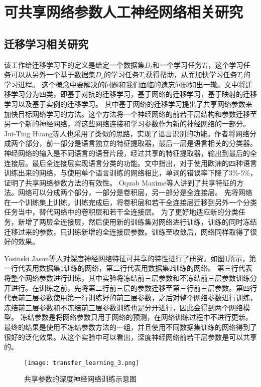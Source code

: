 \section{可共享网络参数人工神经网络相关研究}

\subsection{迁移学习相关研究}
该工作\cite{10.1007/978-3-030-01424-7_27}给迁移学习下的定义是给定一个数据集$D_t$和一个学习任务$T_t$，这个学习任务可以从另外一个基于数据集$D_s$的学习任务$T_s$获得帮助，从而加快学习任务$T_t$的学习进程。
这个概念中要解决的问题和我们面临的遗忘问题如出一辙。文中将迁移学习分为四类，即基于对抗的迁移学习，基于网络的迁移学习，基于映射的迁移学习以及基于实例的迁移学习。
其中基于网络的迁移学习提出了共享网络参数来加快目标网络学习的方法。这个方法将一个神经网络的前若干层结构和参数迁移至另一个新的神经网络，将这些网络连接和学习参数作为新的神经网络的一部分。
Jui-Ting Huang等人\cite{6639081}也采用了类似的思路，实现了语言识别的功能。作者将网络分成两个部分，前一部分是语言独立的特征提取器，最后一层是语言相关的分类器。
神经网络的输入是不同语言的语音片段，经过共享的特征提取器，输出到最后的全连接层。最后全连接层实现语言分类的功能。文中指出，对于使用欧洲的四种语言训练出来的网络，与使用单个语言训练的网络相比，单词的错误率下降了3\%-5\%，证明了共享网络参数方法的有效性。
Oquab Maxime等人\cite{Oquab_2014_CVPR}讲到了共享特征的方法。网络可以分成两个部分，一部分是卷积层，另一部分是全连接层。
先将网络在一个训练集上训练，训练完成后，将卷积层和若干全连接层迁移到另外一个分类任务当中，替代网络中的卷积层和若干全连接层。
为了更好地适应新的分类任务，新增了两层全连接层，然后使用新的训练集对网络进行训练，训练的同时冻结迁移过来的参数，只训练新增的全连接层参数。训练至收敛后，网络同样取得了很好的效果。 

Yosinski Jason等人\cite{yosinski_2014_NIPS}对深度神经网络特征可共享的特性进行了研究。如图\ref{fig:transfer_learning_3}所示，第一行代表用数据集1训练的网络，第二行代表用数据集2训练的网络。
第三行代表将整个网络参数进行训练，其中实验将冻结前三层参数和不冻结前三层参数训练分开进行。在训练之前，先将第二行前三层的参数迁移至第三行前三层参数。第四行代表前三层参数使用第一行训练好的前三层参数，之后对整个网络参数进行训练，冻结前三层参数和不冻结前三层参数训练也是分开进行，因此会得到两个网络模型。
冻结参数是将网络参数只用于网络的预测，在网络训练过程中不进行更新。
最终的结果是使用不冻结参数方法的一组，并且使用不同数据集训练的网络得到了很好的泛化效果。从这个实验中可以看出，深度神经网络前若干层参数是可以共享的。
\begin{figure}
    \centering
    \texttt{[image: transfer\_learning\_3.png]}
    \caption{共享参数的深度神经网络训练示意图}
    \label{fig:transfer_learning_3}
\end{figure}

